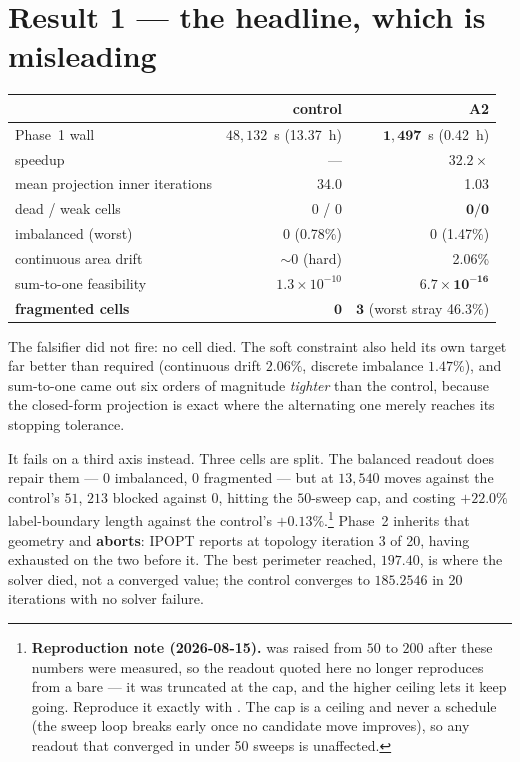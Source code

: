 \documentclass[11pt,a4paper]{article}
\begin{document}
\section{Result 1 --- the headline, which is misleading}

\begin{center}
\begin{tabular}{@{}lrr@{}}
\toprule
 & control & A2 \\
\midrule
Phase~1 wall & \(48{,}132\)~s (13.37~h) & \(\mathbf{1{,}497}\)~s (0.42~h) \\
speedup & --- & \(\mathbf{32.2\times}\) \\
mean projection inner iterations & 34.0 & 1.03 \\
dead / weak cells & 0 / 0 & \(\mathbf{0 / 0}\) \\
imbalanced (worst) & 0 (0.78\%) & 0 (1.47\%) \\
continuous area drift & \(\sim\)0 (hard) & 2.06\% \\
sum-to-one feasibility & \(1.3\times10^{-10}\) & \(\mathbf{6.7\times10^{-16}}\) \\
\midrule
\textbf{fragmented cells} & \(\mathbf{0}\) & \(\mathbf{3}\) (worst stray 46.3\%) \\
\bottomrule
\end{tabular}
\end{center}

The falsifier did not fire: no cell died. The soft constraint also held its own
target far better than required (continuous drift \(2.06\%\), discrete imbalance
\(1.47\%\)), and sum-to-one came out six orders of magnitude \emph{tighter} than
the control, because the closed-form projection is exact where the alternating
one merely reaches its stopping tolerance.

It fails on a third axis instead. Three cells are split. The balanced readout
does repair them --- \(0\) imbalanced, \(0\) fragmented --- but at
\(13{,}540\) moves against the control's \(51\), \(213\) blocked against \(0\),
hitting the \(50\)-sweep cap, and costing \(+22.0\%\) label-boundary length
against the control's \(+0.13\%\).\footnote{\textbf{Reproduction note
(2026-08-15).}  was raised from
\(50\) to \(200\) after these numbers were measured, so the readout quoted here
no longer reproduces from a bare
 --- it was truncated at the cap,
and the higher ceiling lets it keep going. Reproduce it exactly with
. The cap is a ceiling and never a schedule (the
sweep loop breaks early once no candidate move improves), so any readout that
converged in under 50 sweeps is unaffected.} Phase~2 inherits that geometry and
\textbf{aborts}: IPOPT reports  at topology
iteration 3 of 20, having exhausted  on the two before it.
The best perimeter reached, \(197.40\), is where the solver died, not a converged
value; the control converges to \(185.2546\) in 20 iterations with no solver
failure.
\end{document}
